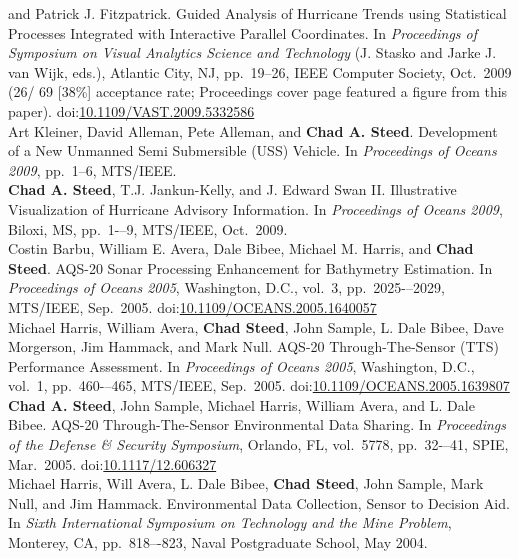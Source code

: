\documentclass[11pt, letterpaper]{article}
\newcommand{\amper}{{\fontspec[Scale=.95]{Hoefler Text}\selectfont\itshape\&}}
\newcommand{\years}[1]{\marginnote{\scriptsize #1}}
\begin{document}
\begin{sloppypar}
and Patrick J. Fitzpatrick. Guided Analysis of Hurricane Trends using
Statistical Processes Integrated with Interactive Parallel Coordinates.  In
\emph{Proceedings of Symposium on Visual Analytics Science and Technology}
(J. Stasko and Jarke J. van Wijk, eds.), Atlantic City, NJ, pp.\ 19--26, IEEE
Computer Society, Oct.\ 2009 (26/ 69 [38\%] acceptance rate; Proceedings
cover page featured a figure from this paper).
doi:\href{http://dx.doi.org/10.1109/VAST.2009.5332586}
{10.1109/VAST.2009.5332586}\\
\years{2009}Art Kleiner, David Alleman, Pete Alleman, and
\textbf{Chad A. Steed}.  Development of a New Unmanned Semi Submersible (USS)
Vehicle. In \emph{Proceedings of Oceans 2009}, pp.\ 1--6, MTS/IEEE.\\
\years{2009}\textbf{Chad A. Steed}, T.J. Jankun-Kelly,  and J. Edward Swan
II. Illustrative Visualization of Hurricane Advisory Information. In
\emph{Proceedings of Oceans 2009}, Biloxi, MS, pp.\ 1-–9, MTS/IEEE, Oct.\ 2009.\\
\years{2005}Costin Barbu, William E. Avera, Dale Bibee, Michael M. Harris,
and \textbf{Chad Steed}. AQS-20 Sonar Processing Enhancement for Bathymetry
Estimation.  In \emph{Proceedings of Oceans 2005}, Washington, D.C., vol.\ 3,
pp.\ 2025-–2029, MTS/IEEE, Sep.\ 2005.
doi:\href{http://dx.doi.org/10.1109/OCEANS.2005.1640057}
{10.1109/OCEANS.2005.1640057}\\
\years{2005}Michael Harris, William Avera, \textbf{Chad Steed}, John Sample,
L. Dale Bibee, Dave Morgerson, Jim Hammack, and Mark Null.  AQS-20
Through-The-Sensor (TTS) Performance Assessment.  In \emph{Proceedings of
Oceans 2005}, Washington, D.C., vol.\ 1, pp.\ 460-–465, MTS/IEEE, Sep.\ 2005.
doi:\href{http://dx.doi.org/10.1109/OCEANS.2005.1639807}
{10.1109/OCEANS.2005.1639807}\\
\years{2005}\textbf{Chad A. Steed}, John Sample, Michael Harris, William
Avera, and L. Dale Bibee. AQS-20 Through-The-Sensor Environmental Data
Sharing.  In \emph{Proceedings of the Defense \amper{} Security Symposium},
Orlando, FL, vol.\ 5778, pp.\ 32-–41, SPIE, Mar.\ 2005.
doi:\href{http://dx.doi.org/10.1117/12.606327}{10.1117/12.606327}\\
\years{2004}Michael Harris, Will Avera, L. Dale Bibee, \textbf{Chad Steed},
John Sample, Mark Null, and Jim Hammack.  Environmental Data Collection,
Sensor to Decision Aid.  In \emph{Sixth International Symposium on Technology
and the Mine Problem}, Monterey, CA, pp.\ 818–-823, Naval Postgraduate
School, May 2004.\\

\end{sloppypar}
\end{document}
